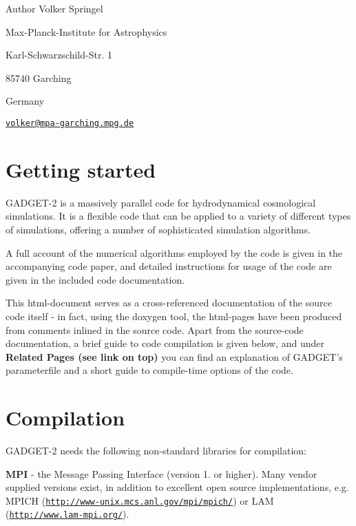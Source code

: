 \begin{DoxyAuthor}{\-Author}
\-Volker \-Springel \par
 \-Max-\/\-Planck-\/\-Institute for \-Astrophysics \par
 \-Karl-\/\-Schwarzschild-\/\-Str. 1 \par
 85740 \-Garching \par
 \-Germany \par
 \href{mailto:volker@mpa-garching.mpg.de}{\tt volker@mpa-\/garching.\-mpg.\-de} \par

\end{DoxyAuthor}
\par
\hypertarget{index_prelim}{}\section{\-Getting started}\label{index_prelim}
\-G\-A\-D\-G\-E\-T-\/2 is a massively parallel code for hydrodynamical cosmological simulations. \-It is a flexible code that can be applied to a variety of different types of simulations, offering a number of sophisticated simulation algorithms.

\-A full account of the numerical algorithms employed by the code is given in the accompanying code paper, and detailed instructions for usage of the code are given in the included code documentation.

\-This html-\/document serves as a cross-\/referenced documentation of the source code itself -\/ in fact, using the doxygen tool, the html-\/pages have been produced from comments inlined in the source code. \-Apart from the source-\/code documentation, a brief guide to code compilation is given below, and under {\bfseries \-Related \-Pages (see link on top)} you can find an explanation of \-G\-A\-D\-G\-E\-T's parameterfile and a short guide to compile-\/time options of the code.\hypertarget{index_install}{}\section{\-Compilation}\label{index_install}
\-G\-A\-D\-G\-E\-T-\/2 needs the following non-\/standard libraries for compilation\-:


\begin{DoxyItemize}
\item {\bfseries \-M\-P\-I} -\/ the \-Message \-Passing \-Interface (version 1. or higher). \-Many vendor supplied versions exist, in addition to excellent open source implementations, e.\-g. \-M\-P\-I\-C\-H (\href{http://www-unix.mcs.anl.gov/mpi/mpich/}{\tt http\-://www-\/unix.\-mcs.\-anl.\-gov/mpi/mpich/}) or \-L\-A\-M (\href{http://www.lam-mpi.org/}{\tt http\-://www.\-lam-\/mpi.\-org/}).
\end{DoxyItemize}


